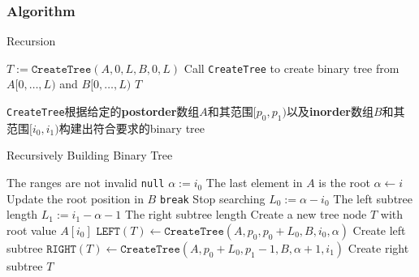 \subsubsection{Algorithm}
\setcounter{algorithm}{0}
\begin{algorithm}[H]
\caption{Recursion}
\begin{algorithmic}[1]
\State $T:=\texttt{CreateTree}(A, 0, L, B, 0, L)$ \Comment Call \texttt{CreateTree} to create binary tree from $A[0,\ldots, L)$ and $B[0,\ldots,L)$
\State \Return $T$
\EndProcedure
\end{algorithmic}
\end{algorithm}
\begin{CJK*}{UTF8}{gbsn}
\texttt{CreateTree}根据给定的\textbf{postorder}数组$A$和其范围$[p_0, p_1)$以及\textbf{inorder}数组$B$和其范围$[i_0, i_1)$构建出符合要求的binary tree
\end{CJK*}
\begin{algorithm}[H]
\caption{Recursively Building Binary Tree}
\begin{algorithmic}[1]
 \Comment The ranges are not invalid
\State \Return \texttt{null}
\EndIf
\State $\alpha:=i_0$
 \Comment The last element in $A$ is the root
\State $\alpha\gets i$ \Comment Update the root position in $B$
\State \texttt{break} \Comment Stop searching
\EndIf
\EndFor
\State $L_0:=\alpha - i_0$ \Comment The left subtree length
\State $L_1:=i_1 - \alpha - 1$ \Comment The right subtree length
\State Create a new tree node $T$ with root value $A[i_0]$
\State $\texttt{LEFT}(T)\gets \texttt{CreateTree}(A, p_0, p_0+L_0, B, i_0, \alpha)$ \Comment Create left subtree
\State $\texttt{RIGHT}(T) \gets \texttt{CreateTree}(A, p_0+L_0, p_1-1, B, \alpha+1, i_1)$ \Comment Create right subtree
\State \Return $T$
\EndFunction
\end{algorithmic}
\end{algorithm}